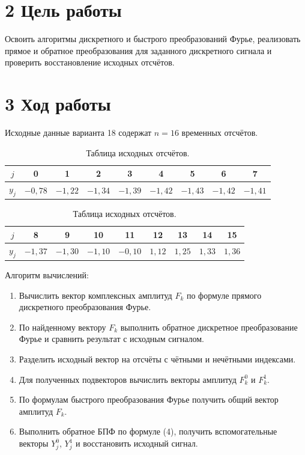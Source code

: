 \documentclass[14pt,a4paper]{extarticle}
\begin{document}
\section*{2 Цель работы}
Освоить алгоритмы дискретного и быстрого преобразований Фурье, реализовать прямое и обратное преобразования для заданного дискретного сигнала и проверить восстановление исходных отсчётов.

\newpage

\section*{3 Ход работы}
Исходные данные варианта 18 содержат $n=16$ временных отсчётов.

\begin{table}[H]
\centering
\caption{Таблица исходных отсчётов.}
\small
\begin{tabular}{|c|c|c|c|c|c|c|c|c|}
\hline
$j$ & 0 & 1 & 2 & 3 & 4 & 5 & 6 & 7 \\ \hline
$y_j$ & $-0{,}78$ & $-1{,}22$ & $-1{,}34$ & $-1{,}39$ & $-1{,}42$ & $-1{,}43$ & $-1{,}42$ & $-1{,}41$ \\ \hline
\end{tabular}

\vspace{6pt}

\begin{tabular}{|c|c|c|c|c|c|c|c|c|}
\hline
$j$ & 8 & 9 & 10 & 11 & 12 & 13 & 14 & 15 \\ \hline
$y_j$ & $-1{,}37$ & $-1{,}30$ & $-1{,}10$ & $-0{,}10$ & $1{,}12$ & $1{,}25$ & $1{,}33$ & $1{,}36$ \\ \hline
\end{tabular}
\end{table}

Алгоритм вычислений:
\begin{enumerate}
    \item Вычислить вектор комплексных амплитуд $F_k$ по формуле прямого дискретного преобразования Фурье.
    \item По найденному вектору $F_k$ выполнить обратное дискретное преобразование Фурье и сравнить результат с исходным сигналом.
    \item Разделить исходный вектор на отсчёты с чётными и нечётными индексами.
    \item Для полученных подвекторов вычислить векторы амплитуд $F^0_k$ и $F^1_k$.
    \item По формулам быстрого преобразования Фурье получить общий вектор амплитуд $F_k$.
    \item Выполнить обратное БПФ по формуле (4), получить вспомогательные векторы $Y^0_j$, $Y^1_j$ и восстановить исходный сигнал.
\end{enumerate}
\end{document}
